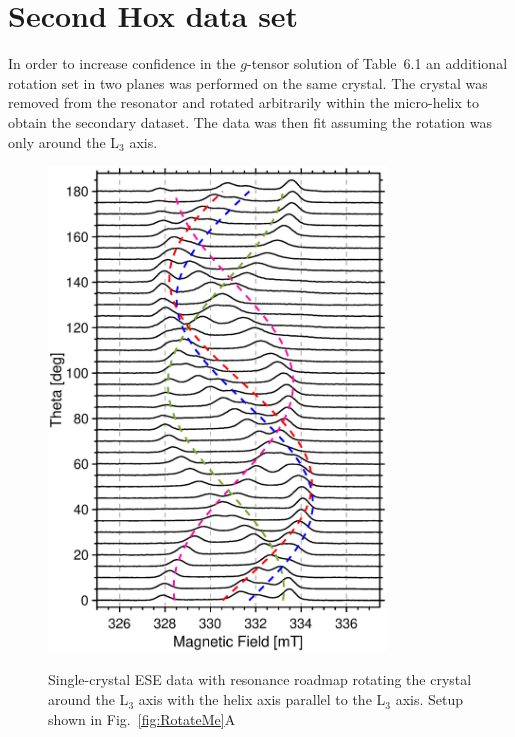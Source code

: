 \chapter[Second Hox data set]{Second Hox data set}

In order to increase confidence in the $g$-tensor solution of Table~6.1 an additional rotation set in two planes was performed on the same crystal. The crystal was removed from the resonator and rotated arbitrarily within the micro-helix to obtain the secondary dataset. The data was then fit assuming the rotation was only around the L$_3$ axis. 

\begin{figure}[ht]
\centering
 \includegraphics[width=0.8\textwidth]{Kapitel/Appendix/RotateCrystal180.eps}\label{fig-app:Rotate}
 \caption[Single Crystal Roadmap around L$_3$ axis]{Single-crystal ESE data with resonance roadmap rotating the crystal around the L$_3$ axis with the helix axis parallel to the L$_3$ axis. Setup shown in Fig.~\ref{fig:RotateMe}A} 
\end{figure} 

